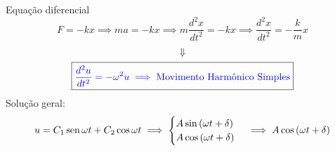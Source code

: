 \begin{frame}{Equação diferencial}
    \[
        F=-kx \implies ma=-kx \implies m\frac{d^2 x}{dt^2}=-kx \implies \frac{d^2 x}{dt^2}=-\frac{k}{m} x
    \]
    \begin{gather*}
    \Downarrow \\
    \boxed{\color{blue} \frac{d^2 u}{dt^2}= -\omega^2 u \implies \text{Movimento Harmônico Simples}}
    \end{gather*}
    Solução geral:
    \[
        u=C_1 \operatorname{sen}{\omega t} + C_2 \cos{\omega t} \implies
        \begin{cases}
            A \sin{(\omega t + \delta)} \\
            A \cos{(\omega t + \delta)}
        \end{cases}
        \implies A \cos{(\omega t + \delta)}
    \]
\end{frame}

